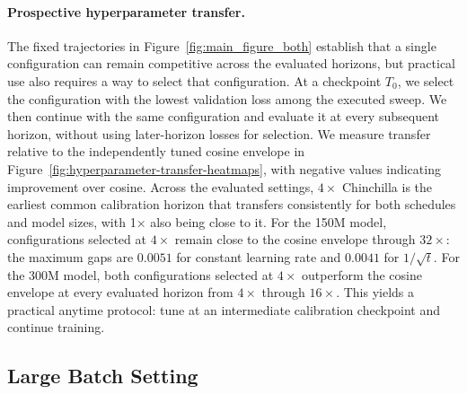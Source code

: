 \documentclass{article}
\theoremstyle{plain}
\begin{document}
\paragraph{Prospective hyperparameter transfer.}
The fixed trajectories in Figure~\ref{fig:main_figure_both} establish that a single configuration can remain competitive across the evaluated horizons, but practical use also requires a way to select that configuration. At a checkpoint $T_0$, we select the configuration with the lowest validation loss among the executed sweep. We then continue with the same configuration and evaluate it at every subsequent horizon, without using later-horizon losses for selection. We measure transfer relative to the independently tuned cosine envelope in Figure~\ref{fig:hyperparameter-transfer-heatmaps}, with negative values indicating improvement over cosine. Across the evaluated settings, $4\times$ Chinchilla is the earliest common calibration horizon that transfers consistently for both schedules and model sizes, with 1$\times$ also being close to it. For the 150M model, configurations selected at $4\times$ remain close to the cosine envelope through $32\times$: the maximum gaps are $0.0051$ for constant learning rate and $0.0041$ for $1/\sqrt{t}$. For the 300M model, both configurations selected at $4\times$ outperform the cosine envelope at every evaluated horizon from $4\times$ through $16\times$. This yields a practical anytime protocol: tune at an intermediate calibration checkpoint and continue training. 

\subsection{Large Batch Setting}
\end{document}
